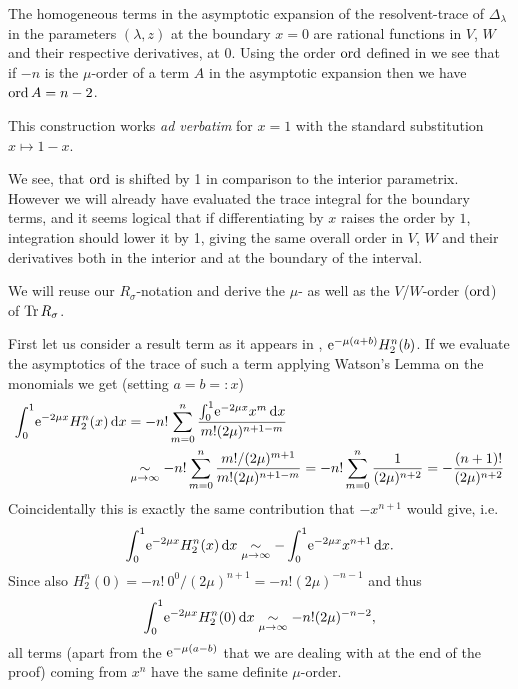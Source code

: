 \begin{MainTheorem}
  The homogeneous terms in the asymptotic expansion of the
  resolvent-trace of $\Delta_\lambda$ in the parameters $(\lambda,z)$ at the
  boundary $x = 0$ are rational functions in $V$, $W$ and their respective
  derivatives, at $0$. Using the order $\ord$ defined in  we
  see that if $-n$ is the $\mu$-order of a term $A$ in the asymptotic expansion
  then we have $\ord A = n - 2$.
  \begin{Remark}
    This construction works \emph{ad verbatim} for $x=1$ with the standard
    substitution $x\mapsto 1 - x$.
  \end{Remark}
  \begin{Remark}
    We see, that $\ord$ is shifted by 1 in comparison to the interior
    parametrix. However we will already have evaluated the trace integral for
    the boundary terms, and it seems logical that if differentiating by $x$
    raises the order by $1$, integration should lower it by 1, giving the same
    overall order in $V$, $W$ and their derivatives both in the interior and at
    the boundary of the interval.
  \end{Remark}
  \begin{Proof}
    We will reuse our $R_\sigma$-notation and derive the $\mu$- as well as the
    $V$/$W$-order ($\ord$) of $\Tr R_\sigma$.

    First let us consider a result term as it appears in ,
    $\Eto{-\mu(a+b)}H^n_2(b)$. If we evaluate the asymptotics of the trace of
    such a term applying Watson's Lemma on the monomials we get (setting $a = b
    =: x$)
    \begin{align*}
      \Int{x}{\Eto{-2\mu x}H^n_2(x)}
      &= -n!\sum_{m=0}^n \frac{\Int{x}{\Eto{-2\mu x} x^m}}{m!(2\mu)^{n+1-m}} \\
      &\SimMu -n!\sum_{m=0}^n \frac{m! / (2\mu)^{m+1}}{m!(2\mu)^{n+1-m}}
      = -n!\sum_{m=0}^n \frac{1}{(2\mu)^{n+2}} = -\frac{(n+1)!}{(2\mu)^{n+2}}
    \end{align*}
    Coincidentally this is exactly the same contribution that $-x^{n+1}$ would
    give, i.e.
    \begin{equation*}
      \Int{x}{\Eto{-2\mu x}H^n_2(x)} \SimMu -\Int{x}{\Eto{-2\mu x}x^{n+1}}.
    \end{equation*}
    Since also $H^n_2(0) = -n!\ 0^0 / (2\mu)^{n+1} = -n! (2\mu)^{-n-1}$ and thus
    \begin{equation*}
      \Int{x}{\Eto{-2\mu x}H^n_2(0)} \SimMu -n! (2\mu)^{-n-2},
    \end{equation*}
    all terms (apart from the $\Eto{-\mu(a-b)}$ that we are dealing with at the
    end of the proof) coming from $x^n$ have the same definite $\mu$-order.


\end{Proof}
\end{MainTheorem}
